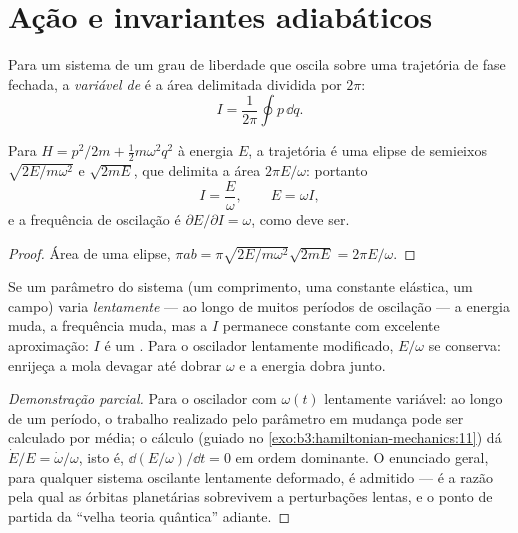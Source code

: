 \section{Ação e invariantes adiabáticos}

\begin{definition}\label{def:b3:hamiltonian-mechanics:action-variable}
Para um sistema de um grau de liberdade que oscila sobre uma trajetória
de fase fechada, a \emph{variável de } é a área delimitada dividida
por $2\pi$:
\[
I = \frac{1}{2\pi}\oint p\,\dd q .
\]
\end{definition}

\begin{proposition}\label{prop:b3:hamiltonian-mechanics:sho-action}
Para $H = p^2/2m + \tfrac12 m\omega^2q^2$ à energia $E$, a trajetória é
uma elipse de semieixos $\sqrt{2E/m\omega^2}$ e $\sqrt{2mE}$, que
delimita a área $2\pi E/\omega$: portanto
\[
I = \frac{E}{\omega} , \qquad E = \omega I ,
\]
e a frequência de oscilação é $\partial E/\partial I = \omega$, como
deve ser.
\end{proposition}

\begin{proof}
Área de uma elipse, $\pi ab = \pi\sqrt{2E/m\omega^2}\sqrt{2mE} =
2\pi E/\omega$.
\end{proof}

\begin{proposition}\label{prop:b3:hamiltonian-mechanics:adiabatic}
Se um parâmetro do sistema (um comprimento, uma constante elástica, um
campo) varia \emph{lentamente} --- ao longo de muitos períodos de
oscilação --- a energia muda, a frequência muda, mas a  $I$
permanece constante com excelente aproximação: $I$ é um
\emph{}. Para o oscilador lentamente modificado,
$E/\omega$ se conserva: enrijeça a mola devagar até dobrar $\omega$ e a
energia dobra junto.
\end{proposition}

\begin{proof}[Demonstração parcial]
Para o oscilador com $\omega(t)$ lentamente variável: ao longo de um
período, o trabalho realizado pelo parâmetro em mudança pode ser
calculado por média; o cálculo (guiado no
\cref{exo:b3:hamiltonian-mechanics:11}) dá $\dot E/E = \dot\omega/\omega$,
isto é, $\dd(E/\omega)/\dd t = 0$ em ordem dominante. O enunciado
geral, para qualquer sistema oscilante lentamente deformado, é
admitido --- é a razão pela qual as órbitas planetárias sobrevivem a
perturbações lentas, e o ponto de partida da ``velha teoria quântica''
adiante.
\end{proof}

